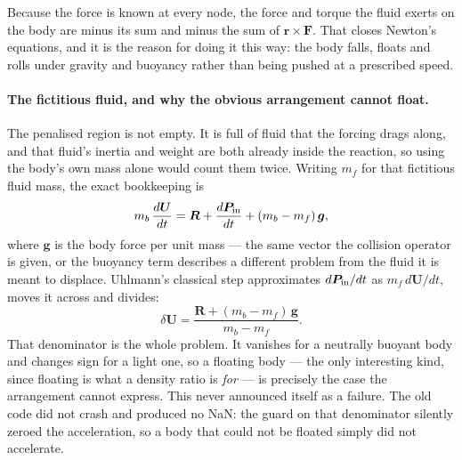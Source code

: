 \documentclass[11pt,a4paper]{article}
\begin{document}
Because the force is known at every node, the force and torque the fluid exerts
on the body are minus its sum and minus the sum of $\bm{r}\times\bm{F}$. That
closes Newton's equations, and it is the reason for doing it this way: the body
falls, floats and rolls under gravity and buoyancy rather than being pushed at a
prescribed speed.

\paragraph{The fictitious fluid, and why the obvious arrangement cannot float.}
The penalised region is not empty. It is full of fluid that the forcing drags
along, and that fluid's inertia and weight are both already inside the reaction,
so using the body's own mass alone would count them twice. Writing $m_f$ for that
fictitious fluid mass, the exact bookkeeping is
\[
  m_b\,\frac{d\bm{U}}{dt}
    = \bm{R} + \frac{d\bm{P}_{\rm in}}{dt} + (m_b-m_f)\,\bm{g},
\]
where $\bm{g}$ is the body force per unit mass --- the same vector the collision
operator is given, or the buoyancy term describes a different problem from the
fluid it is meant to displace. Uhlmann's classical step approximates
$d\bm{P}_{\rm in}/dt$ as $m_f\,d\bm{U}/dt$, moves it across and divides:
\[
  \delta\bm{U} = \frac{\bm{R} + (m_b-m_f)\,\bm{g}}{m_b - m_f}.
\]
That denominator is the whole problem. It vanishes for a neutrally buoyant body
and changes sign for a light one, so a floating body --- the only interesting
kind, since floating is what a density ratio is \emph{for} --- is precisely the
case the arrangement cannot express. This never announced itself as a failure.
The old code did not crash and produced no NaN: the guard on that denominator
silently zeroed the acceleration, so a body that could not be floated simply did
not accelerate.
\end{document}

